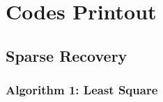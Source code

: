 \documentclass[11pt,a4paper]{report}
\begin{document}
%
%
%
%
%
%
%
%
%

\newpage
\appendix
\chapter{Codes Printout}

\section{Sparse Recovery}
\subsection{Algorithm 1: Least Square}

\newpage
\end{document}
